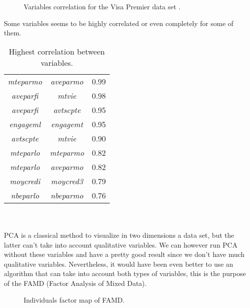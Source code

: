 \begin{figure}[H]
    \centering
    
    \caption{Variables correlation for the Visa Premier data set .}
    \label{fig:visa_corrplot}
\end{figure}

Some variables seems to be highly correlated or even completely for some of them.

\begin{table}[H] 
    \centering
    \begin{tabular}{|c|c|c|}
        \hline
        \textit{mteparmo} & \textit{aveparmo} & 0.99 \\
        \textit{aveparfi} & \textit{mtvie} & 0.98 \\
        \textit{aveparfi} & \textit{avtscpte} & 0.95 \\
        \textit{engageml} & \textit{engagemt} & 0.95 \\
        \textit{avtscpte} & \textit{mtvie} & 0.90 \\
        \textit{mteparlo} & \textit{mteparmo} & 0.82 \\
        \textit{mteparlo} & \textit{aveparmo} & 0.82 \\
        \textit{moycredi} & \textit{moycred3} & 0.79 \\
        \textit{nbeparlo} & \textit{nbeparmo} & 0.76 \\
        \hline
    \end{tabular}
    \caption{Highest correlation between variables.}
    \label{tab:visa_corr_table}
\end{table}

\\\\

PCA is a classical method to visualize in two dimensions a data set, but the latter can't take into account qualitative variables. We can however run PCA without these variables and have a pretty good result since we don't have much qualitative variables. Nevertheless, it would have been even better to use an algorithm that can take into account both types of variables, this is the purpose of the FAMD (Factor Analysis of Mixed Data). 

\begin{figure}[H]
    \centering
    
    \caption{Individuals factor map of FAMD.}
    \label{fig:famd_ind}
\end{figure}


